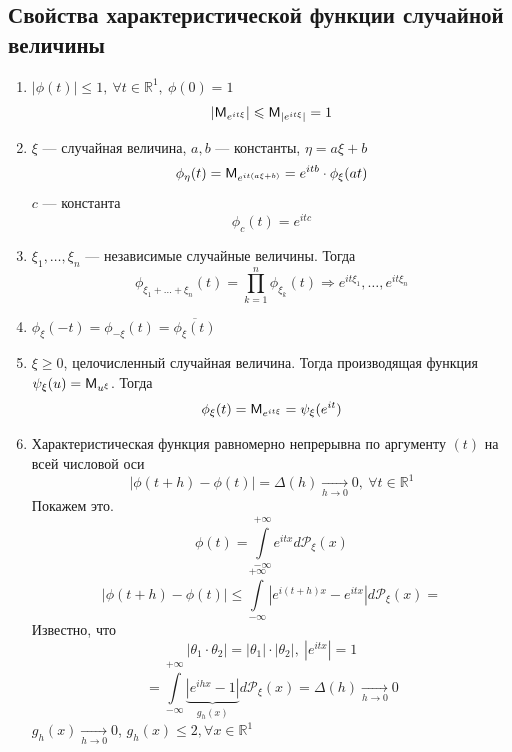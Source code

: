 \subsection{Свойства характеристической функции случайной величины}
\begin{enumerate}[wide, labelwidth=!, labelindent=0pt]
	\item $|\phi(t)| \leqslant 1, \ \forall t \in \mathbb{R}^1, \ \phi(0) = 1$ \\
\[ | \mathsf{M}_{e^{it \xi}} | \leqslant \mathsf{M}_{|e^{it \xi}|} = 1 \]
	\item $\xi$ --- случайная величина, $a, b$ --- константы, $\eta = a \xi + b$
\[
	\phi_{\eta} (t) = \mathsf{M}_{e^{it(a \xi + b)}} = e^{it b} \cdot \phi_{\xi} (at)
\]
$c$ --- константа
\[
	\phi_c (t) = e^{itc}
\]
	\item $\xi_1, \ldots, \xi_n$ --- независимые случайные величины. Тогда
\[
	\phi_{\xi_1 + \ldots + \xi_n} (t) = \prod\limits_{k = 1}^{n} \phi_{\xi_k} (t) \Rightarrow e^{it \xi_1}, \ldots, e^{it \xi_n}
\]
\item $\phi_{\xi} (-t) = \phi_{- \xi} (t) = \overline{\phi_{\xi} (t)}$
\item $\xi \geqslant 0$, целочисленный случайная величина. Тогда производящая функция $\psi_{\xi} (u) = \mathsf{M}_{u^{\xi}}$. Тогда
\[
	\phi_{\xi} (t) = \mathsf{M}_{e^{it\xi}} = \psi_{\xi} (e^{it})
\]
\item Характеристическая функция равномерно непрерывна по аргументу $(t)$ на всей числовой оси
\[
	| \phi(t + h) - \phi(t) | = \Delta (h) \underset{h \to 0}{\rightarrow} 0, \ \forall t \in \mathbb{R}^1
\]
Покажем это.
\[
	\phi(t) = \int\limits_{-\infty}^{+\infty} e^{itx} d \mathcal{P}_{\xi} (x)
\]
\[
	| \phi (t + h) - \phi (t) | \leqslant \int\limits_{-\infty}^{+\infty} | e^{i (t + h) x} - e^{itx} | d \mathcal{P}_{\xi} (x) =
\]
Известно, что
\[
	| \theta_1 \cdot \theta_2 | = |\theta_1| \cdot | \theta_2 |, \ | e^{itx} | = 1
\]
\[
	= \int\limits_{-\infty}^{+\infty} \underbrace{| e^{ihx} - 1 |}_{g_h (x)} d \mathcal{P}_{\xi} (x) = \Delta (h) \underset{h \to 0}{\rightarrow} 0
\]
$g_h(x) \underset{h \to 0}{\rightarrow} 0$, $g_h(x) \leqslant 2, \forall x \in \mathbb{R}^1$

\end{enumerate}

